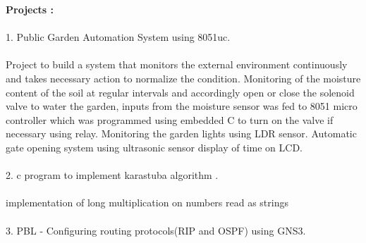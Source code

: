 \documentclass[1pt]{article}
\begin{document}
\begin{flushleft}
		   \hspace{0.2cm}\textbf{Projects : } \\
		   \ \\
		   \hspace{.8cm} 1. Public Garden Automation System using 8051uc.\\
		   \hspace{5.6cm}\\Project to build a system that monitors the external environment
		   continuously and takes necessary action to normalize the condition.
		   Monitoring of the moisture content of the soil at regular intervals
		   and accordingly open or close the solenoid valve to water the
		   garden, inputs from the moisture sensor was fed to 8051 micro
		   controller which was programmed using embedded C to turn on the
		   valve if necessary using relay.
		   Monitoring the garden lights using LDR sensor.
		   Automatic gate opening system using ultrasonic sensor display of
		   time on LCD. \\
		   \ \\
		   \hspace{.8cm} 2. c program to implement karastuba algorithm .\\ \ \\
		   implementation of long multiplication on numbers read as strings\\
		   \ \\
		   \hspace{.8cm} 3. PBL - Configuring routing protocols(RIP and OSPF) using GNS3.
			
	\end{flushleft}
	
\end{document}
